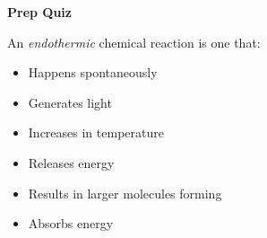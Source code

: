 \vfil \eject

\noindent
{\bf Prep Quiz}

An {\it endothermic} chemical reaction is one that:

\begin{itemize}
\item{} Happens spontaneously
\vskip 5pt
\item{} Generates light
\vskip 5pt
\item{} Increases in temperature
\vskip 5pt
\item{} Releases energy
\vskip 5pt
\item{} Results in larger molecules forming
\vskip 5pt
\item{} Absorbs energy
\end{itemize}






